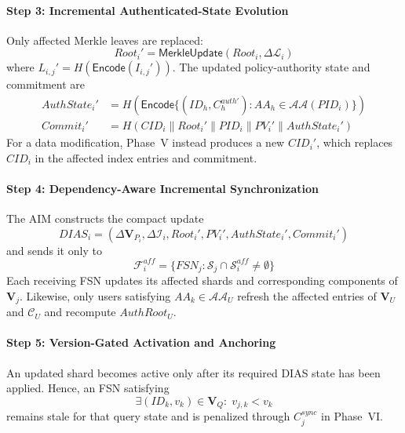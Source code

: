 \documentclass{ieeetj}
\theoremstyle{ieee-style}
\begin{document}
\paragraph*{Step 3: Incremental Authenticated-State Evolution}

Only affected Merkle leaves are replaced:
\begin{equation}
Root_i'
=
\mathsf{MerkleUpdate}(Root_i,\Delta\mathcal{L}_i)
\end{equation}
where
$L_{i,j}'=H(\mathsf{Encode}(I_{i,j}'))$.
The updated policy-authority state and commitment are
\begin{align}
AuthState_i'
&=
H\!\left(
\mathsf{Encode}
\{(ID_h,C_h^{auth\prime}):
AA_h\in\mathcal{AA}(PID_i)\}
\right)\\
Commit_i'
&=
H(CID_i\parallel Root_i'\parallel PID_i
\parallel PV_i'\parallel AuthState_i')
\label{eq:updated-commitment}
\end{align}
For a data modification, Phase~V instead produces a new $CID_i'$, which
replaces $CID_i$ in the affected index entries and commitment.

\paragraph*{Step 4: Dependency-Aware Incremental Synchronization}

The AIM constructs the compact update
\begin{equation}
DIAS_i=
(\Delta\mathbf{V}_{P_i},
\Delta\mathcal{I}_i,
Root_i',PV_i',AuthState_i',Commit_i')
\label{eq:dias-message}
\end{equation}
and sends it only to
\begin{equation}
\mathcal{F}_i^{aff}
=
\{FSN_j:\mathcal{S}_j\cap\mathcal{S}_i^{aff}\neq\emptyset\}
\end{equation}
Each receiving FSN updates its affected shards and corresponding
components of $\mathbf{V}_j$. Likewise, only users satisfying
$AA_k\in\mathcal{AA}_U$ refresh the affected entries of
$\mathbf{V}_U$ and $\mathcal{C}_U$ and recompute $AuthRoot_U$.

\paragraph*{Step 5: Version-Gated Activation and Anchoring}

An updated shard becomes active only after its required DIAS state has
been applied. Hence, an FSN satisfying
\begin{equation}
\exists(ID_k,v_k)\in\mathbf{V}_Q:\;v_{j,k}<v_k
\end{equation}
remains stale for that query state and is penalized through
$C_j^{sync}$ in Phase~VI.
\end{document}
